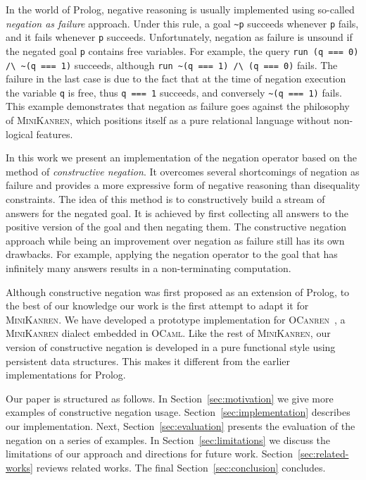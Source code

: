 In the world of Prolog, negative reasoning is usually implemented 
using so-called \emph{negation as failure} approach.
Under this rule, a goal \lstinline{~p} succeeds whenever \lstinline{p} fails, 
and it fails whenever \lstinline{p} succeeds.
Unfortunately, negation as failure is unsound 
if the negated goal \lstinline{p} contains free variables.
For example, the query \lstinline{run (q === 0) /\ ~(q === 1)} succeeds, 
although \lstinline{run ~(q === 1) /\ (q === 0)} fails.
The failure in the last case is due to the fact that 
at the time of negation execution the variable \lstinline{q} is free, 
thus \lstinline{q === 1} succeeds, and conversely \lstinline{~(q === 1)} fails.
This example demonstrates that
negation as failure goes against the philosophy of \textsc{MiniKanren}, 
which positions itself as a pure relational language
without non-logical features.

In this work we present an implementation of the negation operator
based on the method of \emph{constructive negation}.
It overcomes several shortcomings of negation as failure 
and provides a more expressive form of 
negative reasoning than disequality constraints. 
The idea of this method is to constructively 
build a stream of answers for the negated goal.
It is achieved by first collecting all answers to 
the positive version of the goal and then negating them. 
The constructive negation approach 
while being an improvement over negation as failure 
still has its own drawbacks. 
For example, applying the negation operator 
to the goal that has infinitely many answers 
results in a non-terminating computation. 

Although constructive negation was first 
proposed as an extension of Prolog, 
to the best of our knowledge 
our work is the first attempt to adapt it for \textsc{MiniKanren}. 
We have developed a prototype implementation for \textsc{OCanren}~\cite{kosarev2018typed}, 
a \textsc{MiniKanren} dialect embedded in \textsc{OCaml}. 
Like the rest of \textsc{MiniKanren}, 
our version of constructive negation is developed 
in a pure functional style using
persistent data structures.
This makes it different from the earlier implementations for Prolog.

Our paper is structured as follows.
In Section~\ref{sec:motivation} we give 
more examples of constructive negation usage. 
Section~\ref{sec:implementation} describes our implementation.
Next, Section~\ref{sec:evaluation} presents the evaluation
of the negation on a series of examples.
In Section~\ref{sec:limitations} 
we discuss the limitations of our approach and 
directions for future work. 
Section~\ref{sec:related-works} reviews related works. 
The final Section~\ref{sec:conclusion} concludes.

